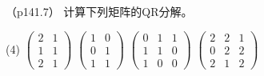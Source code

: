 \documentclass[12pt, a4paper, oneside, UTF8]{ctexbook}
\begin{document}
\begin{question}（p141.7）
    计算下列矩阵的QR分解。
    \begin{tasks}[label=(\arabic*)](4)
        \task $\begin{pmatrix}
            2&1\\
            1&1\\
            2&1
        \end{pmatrix}$
        \task $\begin{pmatrix}
            1&0\\
            0&1\\
            1&1
        \end{pmatrix}$
        \task $\begin{pmatrix}
            0&1&1\\
            1&1&0\\
            1&0&0
        \end{pmatrix}$
        \task $\begin{pmatrix}
            2&2&1\\
            0&2&2\\
            2&1&2
        \end{pmatrix}$
    \end{tasks}
\end{question}
\end{document}
